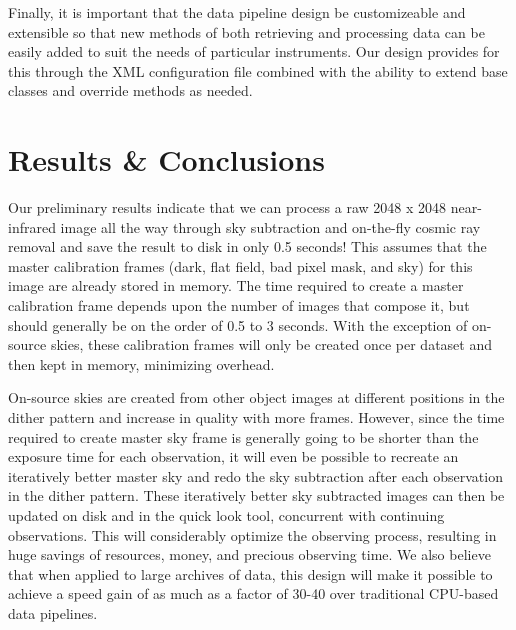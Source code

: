 Finally, it is important that the data pipeline design be customizeable and extensible so that new methods of both retrieving and processing data can be easily added to suit the needs of particular instruments.  Our design provides for this through the XML configuration file combined with the ability to extend base classes and override methods as needed. 

\section{Results \& Conclusions}

Our preliminary results indicate that we can process a raw 2048 x 2048 near-infrared image all the way through sky subtraction and on-the-fly cosmic ray removal and save the result to disk in only 0.5 seconds!  This assumes that the master calibration frames (dark, flat field, bad pixel mask, and sky) for this image are already stored in memory.  The time required to create a master calibration frame depends upon the number of images that compose it, but should generally be on the order of 0.5 to 3 seconds.  With the exception of on-source skies, these calibration frames will only be created once per dataset and then kept in memory, minimizing overhead.

On-source skies are created from other object images at different positions in the dither pattern and increase in quality with more frames.  However, since the time required to create master sky frame is generally going to be shorter than the exposure time for each observation, it will even be possible to recreate an iteratively better master sky and redo the sky subtraction after each observation in the dither pattern.  These iteratively better sky subtracted images can then be updated on disk and in the quick look tool, concurrent with continuing observations.  This will considerably optimize the observing process, resulting in huge savings of resources, money, and precious observing time.  We also believe that when applied to large archives of data, this design will make it possible to achieve a speed gain of as much as a factor of 30-40 over traditional CPU-based data pipelines. 
